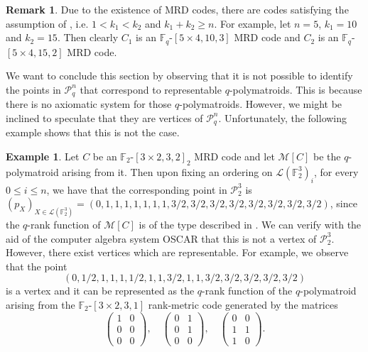 \documentclass[a4paper,11pt,reqno]{amsart}
\theoremstyle{definition}
\newtheorem{example}[theorem]{{{Example}}}
\newtheorem{remark}[theorem]{{{Remark}}}
\newcommand{\mM}{\mathcal{M}}
\newcommand{\mL}{\mathcal{L}}
\newcommand{\F}{\mathbb F}
\newcommand{\RP}{\mathcal{P}_q^n}
\begin{document}
{\begin{remark}
Due to the existence of MRD codes, there are codes satisfying the assumption of , i.e. $1<k_1<k_2$ and $k_1+k_2\geq n$. For example, let $n=5$, $k_1=10$ and $k_2=15$. Then clearly $C_1$ is an $\F_q$-$[5\times 4, 10,3]$ MRD code and $C_2$ is an $\F_q$-$[5\times 4, 15,2]$ MRD code.
\end{remark}


We want to conclude this section by observing that it is not possible to identify the points in $\RP$ that correspond to representable $q$-polymatroids. This is because there is no axiomatic system for those $q$-polymatroids. However, we might be inclined to speculate that they are vertices of $\RP$. Unfortunately, the following example shows that this is not the case. 

\begin{example}
    Let $C$ be an $\F_2$-$[3\times 2,3,2]_2$ MRD code and let $\mM[C]$ be the $q$-polymatroid arising from it. Then upon fixing an ordering on $\mL(\F_{2}^3)_i$, for every $0\leq i\leq n$, we have that the corresponding point in $\mathcal{P}_2^3$ is $(p_X)_{X\in\mL(\F_2^3)}=(0,1,1,1,1,1,1,1, 3/2,3/2,3/2, 3/2,3/2,3/2,3/2,3/2)$, since the $q$-rank function of $\mM[C]$ is of the type described in  . We can verify with the aid of the computer algebra system \textsc{OSCAR} that this is not a vertex of $\mathcal{P}_2^3$. However, there exist vertices which are representable. For example, we observe that the point 
    $$(0,1/2, 1, 1, 1, 1/2, 1, 1, 3/2, 1, 1, 3/2, 3/2, 3/2, 3/2, 3/2)$$
    is a vertex and it can be represented as the $q$-rank function of the $q$-polymatroid arising from the $\F_2$-$[3\times 2,3,1]$ rank-metric code generated by the matrices
    $$\begin{pmatrix}
        1 & 0\\
        0 & 0\\
        0 & 0
    \end{pmatrix}, \quad \begin{pmatrix}
        0 & 1\\
        0 & 1\\
        0 & 0
    \end{pmatrix}, \quad \begin{pmatrix}
        0 & 0\\
        1 & 1\\
        1 & 0
    \end{pmatrix}.$$
\end{example}




}
\end{document}
